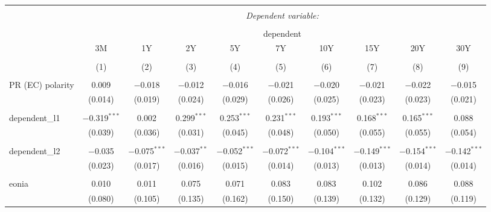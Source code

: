 


\begin{table}[!htbp] \centering 
  \caption{} 
  \label{} 
  \begin{adjustbox}{width=1.35\textwidth}
\begin{tabular}{@{\extracolsep{5pt}}lccccccccc} 
\\[-1.8ex]\hline 
\hline \\[-1.8ex] 
 & \multicolumn{9}{c}{\textit{Dependent variable:}} \\ 
\cline{2-10} 
\\[-1.8ex] & \multicolumn{9}{c}{dependent} \\ 
 & 3M & 1Y & 2Y & 5Y & 7Y & 10Y & 15Y & 20Y & 30Y \\ 
\\[-1.8ex] & (1) & (2) & (3) & (4) & (5) & (6) & (7) & (8) & (9)\\ 
\hline \\[-1.8ex] 
 PR (EC) polarity & 0.009 & $-$0.018 & $-$0.012 & $-$0.016 & $-$0.021 & $-$0.020 & $-$0.021 & $-$0.022 & $-$0.015 \\ 
  & (0.014) & (0.019) & (0.024) & (0.029) & (0.026) & (0.025) & (0.023) & (0.023) & (0.021) \\ 
  & & & & & & & & & \\ 
 dependent\_l1 & $-$0.319$^{***}$ & 0.002 & 0.299$^{***}$ & 0.253$^{***}$ & 0.231$^{***}$ & 0.193$^{***}$ & 0.168$^{***}$ & 0.165$^{***}$ & 0.088 \\ 
  & (0.039) & (0.036) & (0.031) & (0.045) & (0.048) & (0.050) & (0.055) & (0.055) & (0.054) \\ 
  & & & & & & & & & \\ 
 dependent\_l2 & $-$0.035 & $-$0.075$^{***}$ & $-$0.037$^{**}$ & $-$0.052$^{***}$ & $-$0.072$^{***}$ & $-$0.104$^{***}$ & $-$0.149$^{***}$ & $-$0.154$^{***}$ & $-$0.142$^{***}$ \\ 
  & (0.023) & (0.017) & (0.016) & (0.015) & (0.014) & (0.013) & (0.013) & (0.014) & (0.014) \\ 
  & & & & & & & & & \\ 
 eonia & 0.010 & 0.011 & 0.075 & 0.071 & 0.083 & 0.083 & 0.102 & 0.086 & 0.088 \\ 
  & (0.080) & (0.105) & (0.135) & (0.162) & (0.150) & (0.139) & (0.132) & (0.129) & (0.119) \\ 

\end{tabular}
\end{adjustbox}
\end{table}
